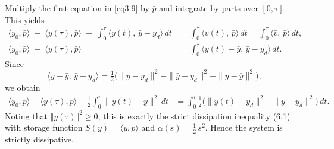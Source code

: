 \documentclass[10pt, a4]{amsart}
\makeatletter
\theoremstyle{plain}
\theoremstyle{definition}
\theoremstyle{remark}
\renewenvironment{proof}[1][\proofname]{\par
  \pushQED{\qed}%
  \normalfont \topsep6\p@\@plus6\p@\relax
  \trivlist
  \item[\hskip\labelsep
        \itshape
    #1\ \ref{#1}.]\ignorespaces
}{%
  \popQED\endtrivlist\@endpefalse
}
\numberwithin{equation}{section}
\makeatother
\begin{document}
\begin{proof}[of Proposition \ref{p6.2}]
Multiply the first equation in \eqref{eq3.9} by \(\bar p\) and integrate by parts over \([0,\tau]\).  This yields
\begin{align}
\langle y_0,\bar p\rangle \;-\;\langle y(\tau),\bar p\rangle
\;-\;\int_0^{\tau}\langle y(t),\,\bar y - y_d\rangle\,dt
&=\int_0^{\tau}\langle v(t),\,\bar p\rangle\,dt
=\int_0^{\tau}\langle \bar v,\,\bar p\rangle\,dt,\\
\langle y_0,\bar p\rangle \;-\;\langle y(\tau),\bar p\rangle
&=\int_0^{\tau}\langle y(t)-\bar y,\,\bar y - y_d\rangle\,dt.
\end{align}
Since
\[
\langle y-\bar y,\,\bar y - y_d\rangle
=\tfrac12\bigl(\|y-y_d\|^2 - \|\bar y - y_d\|^2 - \|y-\bar y\|^2\bigr),
\]
we obtain
\begin{align}
\langle y_0,\bar p\rangle - \langle y(\tau),\bar p\rangle
+ \tfrac12 \int_0^{\tau}\|y(t)-\bar y\|^2\,dt
&= \int_0^{\tau}\tfrac12\bigl(\|y(t)-y_d\|^2 - \|\bar y - y_d\|^2\bigr)\,dt.
\end{align}
Noting that \(\Vert y(\tau)\Vert^2\ge0\), this is exactly the strict dissipation inequality (6.1) with storage function \(S(y)=\langle y,\bar p\rangle\) and
\(\alpha(s)=\tfrac12\,s^2\).  Hence the system is strictly dissipative.
\end{proof}
\end{document}
